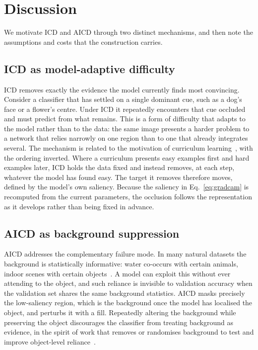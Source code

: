 \section{Discussion}
\label{sec:discussion}

We motivate ICD and AICD through two distinct mechanisms, and then note the
assumptions and costs that the construction carries.

\subsection{ICD as model-adaptive difficulty}
\label{sec:discussion:icd}

ICD removes exactly the evidence the model currently finds most convincing.
Consider a classifier that has settled on a single dominant cue, such as a dog's
face or a flower's centre.  Under ICD it repeatedly encounters that cue occluded
and must predict from what remains.  This is a form of difficulty that adapts to the
model rather than to the data: the same image presents a harder problem to a
network that relies narrowly on one region than to one that already integrates
several.  The mechanism is related to the motivation of
curriculum learning~\citep{bengio2009curriculum}, with the ordering inverted.
Where a curriculum presents easy examples first and hard examples later, ICD
holds the data fixed and instead removes, at each step, whatever the model has
found easy.  The target it removes therefore moves, defined by the model's own
saliency.  Because the
saliency in Eq.~\eqref{eq:gradcam} is recomputed from the current parameters,
the occlusion follows the representation as it develops rather than being fixed
in advance.

\subsection{AICD as background suppression}
\label{sec:discussion:aicd}

AICD addresses the complementary failure mode.  In many natural datasets the
background is statistically informative: water co-occurs with certain animals,
indoor scenes with certain objects~\citep{beery2018recognition}.  A model can
exploit this without ever attending to the object, and such reliance is
invisible to validation accuracy when the validation set shares the same
background statistics.  AICD masks precisely the low-saliency region, which is
the background once the model has localised the object, and perturbs it
with a fill.  Repeatedly altering the background while preserving the object
discourages the classifier from treating background as evidence, in the spirit
of work that removes or randomises background to test and improve object-level
reliance~\citep{xiao2021noise}.

